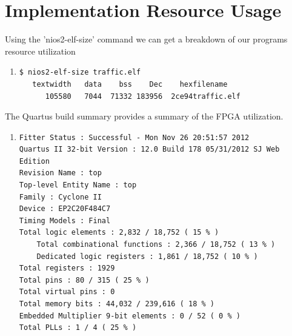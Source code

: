 \documentclass[10pt]{article}
\begin{document}
\section*{Implementation Resource Usage}
Using the 'nios2-elf-size' command we can get a breakdown of our programs resource utilization
\begin{enumerate}
    \item[]
\begin{verbatim}
$ nios2-elf-size traffic.elf 
   textwidth   data    bss    Dec    hexfilename
      105580   7044  71332 183956  2ce94traffic.elf
\end{verbatim}
\end{enumerate}
The Quartus build summary provides a summary of the FPGA utilization.
\begin{enumerate}
\item[]
\begin{verbatim}
Fitter Status : Successful - Mon Nov 26 20:51:57 2012
Quartus II 32-bit Version : 12.0 Build 178 05/31/2012 SJ Web Edition
Revision Name : top
Top-level Entity Name : top
Family : Cyclone II
Device : EP2C20F484C7
Timing Models : Final
Total logic elements : 2,832 / 18,752 ( 15 % )
    Total combinational functions : 2,366 / 18,752 ( 13 % )
    Dedicated logic registers : 1,861 / 18,752 ( 10 % )
Total registers : 1929
Total pins : 80 / 315 ( 25 % )
Total virtual pins : 0
Total memory bits : 44,032 / 239,616 ( 18 % )
Embedded Multiplier 9-bit elements : 0 / 52 ( 0 % )
Total PLLs : 1 / 4 ( 25 % )
\end{verbatim}
\end{enumerate}
\end{document}
